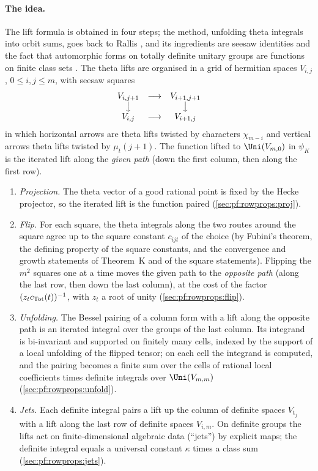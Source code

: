\paragraph{The idea.}
The lift formula is obtained in four steps; the method, unfolding theta integrals into orbit sums, goes back to Rallis
\cite{Rallis1984}, and its ingredients are seesaw identities \cite{Kudla1984,HarrisKudlaSweet1996} and the fact that
automorphic forms on totally definite unitary groups are functions on finite class sets
\cite{Gross1999}. The theta lifts are organised in a grid of hermitian spaces $V_{i,j}$, $0\le i,j\le m$, with seesaw
squares
\[
\begin{array}{ccc}
V_{i,j+1}&\longrightarrow&V_{i+1,j+1}\\
\big\downarrow&&\big\downarrow\\
V_{i,j}&\longrightarrow&V_{i+1,j}
\end{array}
\]
in which horizontal arrows are theta lifts twisted by characters $\chi_{m-i}$ and vertical arrows theta lifts twisted
by $\mu_t(j+1)$. The function lifted to $\Uni(V_{m,0})$ in $\psi_K$ is the iterated lift along the \emph{given path}
(down the first column, then along the first row).
\begin{enumerate}[label=\arabic*.]
\item \emph{Projection.} The theta vector of a good rational point is fixed by the Hecke projector, so the iterated lift
is the function paired (\cref{sec:pf:rowprops:proj}).
\item \emph{Flip.} For each square, the theta integrals along the two routes around the square agree up to the square
constant $c_{ijt}$ of the choice (by Fubini's theorem, the defining property of the square constants, and the
convergence and growth statements of Theorem~K and of the square statements). Flipping the $m^2$ squares one at a
time moves the given path to the \emph{opposite path} (along the last row, then down the last column), at the cost of
the factor $(z_tc_{\mathrm{Tot}}(t))^{-1}$, with $z_t$ a root of unity (\cref{sec:pf:rowprops:flip}).
\item \emph{Unfolding.} The Bessel pairing of a column form with a lift along the opposite path is an iterated integral
over the groups of the last column. Its integrand is bi-invariant and supported on finitely many cells, indexed by the
support of a local unfolding of the flipped tensor; on each cell the integrand is computed, and the pairing becomes a
finite sum over the cells of rational local coefficients times definite integrals over $\Uni(V_{m,m})$
(\cref{sec:pf:rowprops:unfold}).
\item \emph{Jets.} Each definite integral pairs a lift up the column of definite spaces $V_{\mathrm t_j}$ with a lift along
the last row of definite spaces $V_{i,m}$. On definite groups the lifts act on finite-dimensional algebraic data
(``jets'') by explicit maps; the definite integral equals a universal constant $\kappa$ times a class sum
(\cref{sec:pf:rowprops:jets}).
\end{enumerate}
